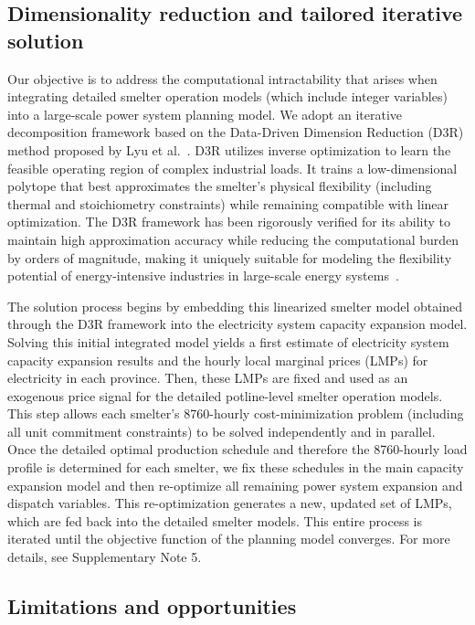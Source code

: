 \documentclass[preprint]{elsarticle}
\begin{document}
\subsection*{Dimensionality reduction and tailored iterative solution}
Our objective is to address the computational intractability that arises when integrating detailed smelter operation models (which include integer variables) into a large-scale power system planning model. We adopt an iterative decomposition framework based on the Data-Driven Dimension Reduction (D3R) method proposed by Lyu et al.~\citep{lyu_data-driven_2025}. D3R utilizes inverse optimization to learn the feasible operating region of complex industrial loads. It trains a low-dimensional polytope that best approximates the smelter's physical flexibility (including thermal and stoichiometry constraints) while remaining compatible with linear optimization. The D3R framework has been rigorously verified for its ability to maintain high approximation accuracy while reducing the computational burden by orders of magnitude, making it uniquely suitable for modeling the flexibility potential of energy-intensive industries in large-scale energy systems~\citep{lyu_data-driven_2025}.

The solution process begins by embedding this linearized smelter model obtained through the D3R framework into the electricity system capacity expansion model. Solving this initial integrated model yields a first estimate of electricity system capacity expansion results and the hourly local marginal prices (LMPs) for electricity in each province.
Then, these LMPs are fixed and used as an exogenous price signal for the detailed potline-level smelter operation models. This step allows each smelter's 8760-hourly cost-minimization problem (including all unit commitment constraints) to be solved independently and in parallel. Once the detailed optimal production schedule and therefore the 8760-hourly load profile is determined for each smelter, we fix these schedules in the main capacity expansion model and then re-optimize all remaining power system expansion and dispatch variables. This re-optimization generates a new, updated set of LMPs, which are fed back into the detailed smelter models. This entire process is iterated until the objective function of the planning model converges. For more details, see Supplementary Note 5.


\subsection*{Limitations and opportunities}
\end{document}
